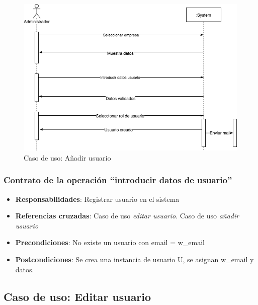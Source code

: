 \documentclass[12pt,a4paperpaper,]{report}
\providecommand{\tightlist}{%
  \setlength{\itemsep}{0pt}\setlength{\parskip}{0pt}}
\begin{document}
\begin{figure}
\centering
\includegraphics{source/figures/secuencia-anadir-usuario.png}
\caption{Caso de uso: Añadir usuario \label{secuencia_anadir_usuario}}
\end{figure}

\subsubsection{\texorpdfstring{Contrato de la operación ``introducir
datos de
usuario''}{Contrato de la operación introducir datos de usuario}}\label{contrato-de-la-operaciuxf3n-introducir-datos-de-usuario}

\begin{itemize}
\tightlist
\item
  \textbf{Responsabilidades}: Registrar usuario en el sistema
\item
  \textbf{Referencias cruzadas}: Caso de uso \emph{editar usuario}. Caso
  de uso \emph{añadir usuario}
\item
  \textbf{Precondiciones}: No existe un usuario con email = w\_email
\item
  \textbf{Postcondiciones}: Se crea una instancia de usuario U, se
  asignan w\_email y datos.
\end{itemize}

\subsection{Caso de uso: Editar
usuario}\label{caso-de-uso-editar-usuario-1}
\end{document}
